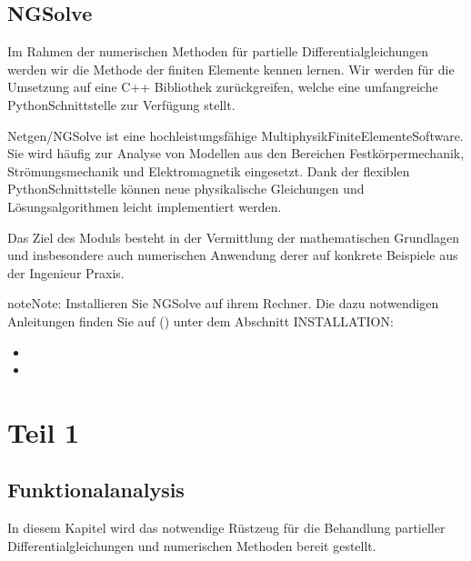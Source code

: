 \documentclass[letterpaper,10pt,english]{jupyterBook}
\begin{document}
\chapter{NGSolve}
\label{\detokenize{Software/NGSolve:ngsolve}}\label{\detokenize{Software/NGSolve::doc}}
Im Rahmen der numerischen Methoden für partielle Differentialgleichungen werden wir die Methode der finiten Elemente kennen lernen. Wir werden für die Umsetzung auf eine C++ Bibliothek  zurückgreifen, welche eine umfangreiche Python\sphinxhyphen{}Schnittstelle zur Verfügung stellt.

Netgen/NGSolve ist eine hochleistungsfähige Multiphysik\sphinxhyphen{}Finite\sphinxhyphen{}Elemente\sphinxhyphen{}Software. Sie wird häufig zur Analyse von Modellen aus den Bereichen Festkörpermechanik, Strömungsmechanik und Elektromagnetik eingesetzt. Dank der flexiblen Python\sphinxhyphen{}Schnittstelle können neue physikalische Gleichungen und Lösungsalgorithmen leicht implementiert werden.

Das Ziel des Moduls besteht in der Vermittlung der mathematischen Grundlagen und insbesondere auch numerischen Anwendung derer auf konkrete Beispiele aus der Ingenieur Praxis.

\begin{sphinxadmonition}{note}{Note:}
Installieren Sie NGSolve auf ihrem Rechner. Die dazu notwendigen Anleitungen finden Sie auf () unter dem Abschnitt INSTALLATION:
\begin{itemize}
\item {} 

\item {} 

\end{itemize}
\end{sphinxadmonition}


\part{Teil 1}


\chapter{Funktionalanalysis}
\label{\detokenize{Funktionalanalysis/Funktionalanalysis:funktionalanalysis}}\label{\detokenize{Funktionalanalysis/Funktionalanalysis::doc}}
In diesem Kapitel wird das notwendige Rüstzeug für die Behandlung partieller Differentialgleichungen und numerischen Methoden bereit gestellt.
\end{document}
